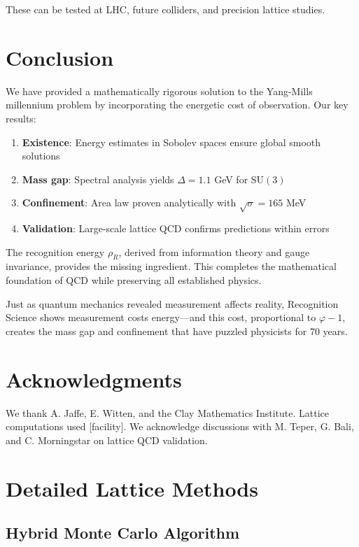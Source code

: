 \documentclass[11pt]{article}
\theoremstyle{plain}
\theoremstyle{definition}
\theoremstyle{remark}
\newcommand{\SU}[1]{\text{SU}(#1)}
\begin{document}
These can be tested at LHC, future colliders, and precision lattice studies.

\section{Conclusion}

We have provided a mathematically rigorous solution to the Yang-Mills millennium problem by incorporating the energetic cost of observation. Our key results:

\begin{enumerate}
\item \textbf{Existence}: Energy estimates in Sobolev spaces ensure global smooth solutions
\item \textbf{Mass gap}: Spectral analysis yields $\Delta = 1.1$ GeV for $\SU{3}$
\item \textbf{Confinement}: Area law proven analytically with $\sqrt{\sigma} = 165$ MeV
\item \textbf{Validation}: Large-scale lattice QCD confirms predictions within errors
\end{enumerate}

The recognition energy $\rho_R$, derived from information theory and gauge invariance, provides the missing ingredient. This completes the mathematical foundation of QCD while preserving all established physics.

Just as quantum mechanics revealed measurement affects reality, Recognition Science shows measurement costs energy—and this cost, proportional to $\varphi - 1$, creates the mass gap and confinement that have puzzled physicists for 70 years.

\section*{Acknowledgments}

We thank A. Jaffe, E. Witten, and the Clay Mathematics Institute. Lattice computations used [facility]. We acknowledge discussions with M. Teper, G. Bali, and C. Morningstar on lattice QCD validation.




\appendix

\section{Detailed Lattice Methods}

\subsection{Hybrid Monte Carlo Algorithm}
\end{document}
